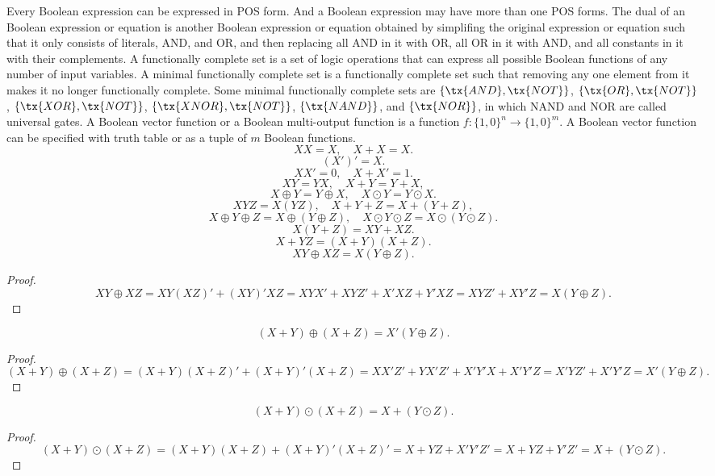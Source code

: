 \documentclass[a4paper,12pt]{article}
\begin{document}
\begin{itemize}
\begin{itemize}
\begin{itemize}
\begin{itemize}
\begin{itemize}
\begin{itemize}
\begin{itemize}
Every Boolean expression can be expressed in POS form. And a Boolean expression may have more than one POS forms.
The dual of an Boolean expression or equation is another Boolean expression or equation obtained by simplifing the original expression or equation such that it only consists of literals, AND, and OR, and then replacing all AND in it with OR, all OR in it with AND, and all constants in it with their complements.
A functionally complete set is a set of logic operations that can express all possible Boolean functions of any number of input variables. A minimal functionally complete set is a functionally complete set such that removing any one element from it makes it no longer functionally complete. Some minimal functionally complete sets are $\{\tx{AND},\tx{NOT}\}$, $\{\tx{OR},\tx{NOT}\}$, $\{\tx{XOR},\tx{NOT}\}$, $\{\tx{XNOR},\tx{NOT}\}$, $\{\tx{NAND}\}$, and $\{\tx{NOR}\}$, in which NAND and NOR are called universal gates.
A Boolean vector function or a Boolean multi-output function is a function $f\colon\{1,0\}^n\to\{1,0\}^m$. A Boolean vector function can be specified with truth table or as a tuple of $m$ Boolean functions.
\[XX = X,\quad X + X = X.\]
\[(X′)′ = X.\]
\[X X′ = 0,\quad X + X′ = 1.\]
\[X Y=Y X,\quad X+Y=Y+X,\]
\[X\oplus Y=Y\oplus X,\quad X\odot Y=Y\odot X.\]
\[X Y Z=X (Y Z),\quad X+Y+Z=X+(Y+Z),\]
\[X\oplus Y\oplus Z=X\oplus (Y\oplus Z),\quad X\odot Y\odot Z=X\odot (Y\odot Z).\]
\[X (Y+Z)=X Y+X Z.\]
\[X+YZ=(X+Y)(X+Z).\]
\[X Y\oplus X Z=X (Y\oplus Z).\]
\begin{proof}
\[X Y\oplus X Z=XY(XZ)'+(XY)'XZ=XYX'+XYZ'+X'XZ+Y'XZ=XYZ'+XY'Z=X(Y\oplus Z).\]
\end{proof}
\[(X+Y)\oplus (X+Z)=X' (Y\oplus Z).\]
\begin{proof}
\[(X+Y)\oplus (X+Z)=(X+Y)(X+Z)'+(X+Y)'(X+Z)=XX'Z'+YX'Z'+X'Y'X+X'Y'Z=X'YZ'+X'Y'Z=X'(Y\oplus Z).\]
\end{proof}
\[(X+Y)\odot (X+Z)=X+(Y\odot Z).\]
\begin{proof}
\[(X+Y)\odot (X+Z)=(X+Y)(X+Z)+(X+Y)'(X+Z)'=X+YZ+X'Y'Z'=X+YZ+Y'Z'=X+(Y\odot Z).\]
\end{proof}

\end{itemize}
\end{itemize}
\end{itemize}
\end{itemize}
\end{itemize}
\end{itemize}
\end{itemize}
\end{document}
